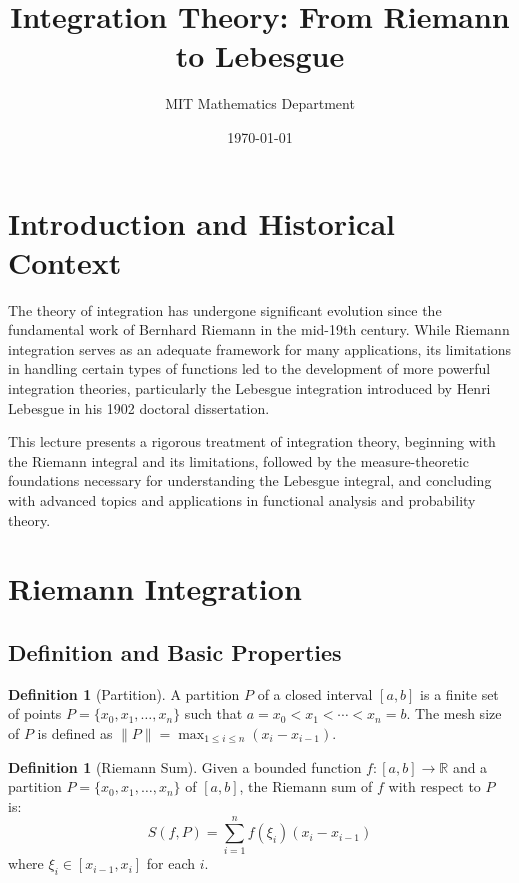\documentclass[12pt,a4paper]{article}
\title{Integration Theory: From Riemann to Lebesgue}
\author{MIT Mathematics Department}
\date{\today}
\theoremstyle{plain}
\theoremstyle{definition}
\newtheorem{definition}[theorem]{Definition}
\begin{document}
\maketitle
\tableofcontents
\newpage

\section{Introduction and Historical Context}

The theory of integration has undergone significant evolution since the fundamental work of Bernhard Riemann in the mid-19th century. While Riemann integration serves as an adequate framework for many applications, its limitations in handling certain types of functions led to the development of more powerful integration theories, particularly the Lebesgue integration introduced by Henri Lebesgue in his 1902 doctoral dissertation.

This lecture presents a rigorous treatment of integration theory, beginning with the Riemann integral and its limitations, followed by the measure-theoretic foundations necessary for understanding the Lebesgue integral, and concluding with advanced topics and applications in functional analysis and probability theory.

\section{Riemann Integration}

\subsection{Definition and Basic Properties}

\begin{definition}[Partition]
A partition $P$ of a closed interval $[a,b]$ is a finite set of points $P = \{x_0, x_1, \ldots, x_n\}$ such that $a = x_0 < x_1 < \cdots < x_n = b$. The mesh size of $P$ is defined as $\|P\| = \max_{1 \leq i \leq n} (x_i - x_{i-1})$.
\end{definition}

\begin{definition}[Riemann Sum]
Given a bounded function $f: [a,b] \to \mathbb{R}$ and a partition $P = \{x_0, x_1, \ldots, x_n\}$ of $[a,b]$, the Riemann sum of $f$ with respect to $P$ is:
\begin{equation}
S(f, P) = \sum_{i=1}^{n} f(\xi_i) (x_i - x_{i-1})
\end{equation}
where $\xi_i \in [x_{i-1}, x_i]$ for each $i$.
\end{definition}
\end{document}
